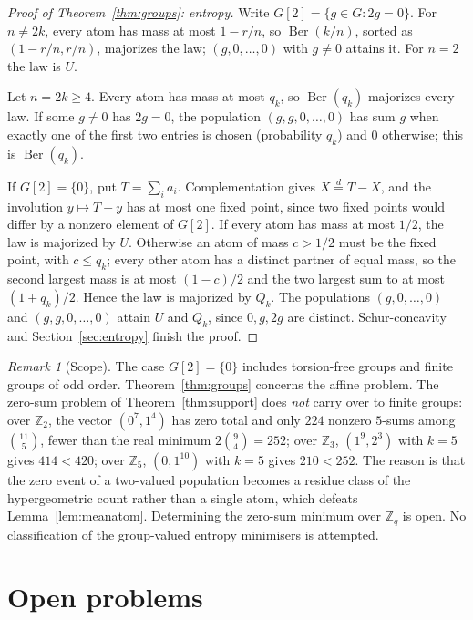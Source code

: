 \documentclass[11pt]{article}
\theoremstyle{remark}
\newtheorem{remark}[theorem]{Remark}
\newcommand{\Z}{\mathbb Z}
\newcommand{\Ber}{\operatorname{Ber}}
\begin{document}
\begin{proof}[Proof of Theorem~\ref{thm:groups}: entropy]
Write \(G[2]=\{g\in G:2g=0\}\). For \(n\ne2k\), every atom has mass at most
\(1-r/n\), so \(\Ber(k/n)\), sorted as \((1-r/n,r/n)\), majorizes the law;
\((g,0,\ldots,0)\) with \(g\ne0\) attains it. For \(n=2\) the law is \(U\).

Let \(n=2k\ge4\). Every atom has mass at most \(q_k\), so \(\Ber(q_k)\)
majorizes every law. If some \(g\ne0\) has \(2g=0\), the population
\((g,g,0,\ldots,0)\) has sum \(g\) when exactly one of the first two entries
is chosen (probability \(q_k\)) and \(0\) otherwise; this is \(\Ber(q_k)\).

If \(G[2]=\{0\}\), put \(T=\sum_ia_i\). Complementation gives
\(X\overset d=T-X\), and the involution \(y\mapsto T-y\) has at most one fixed
point, since two fixed points would differ by a nonzero element of \(G[2]\).
If every atom has mass at most \(1/2\), the law is majorized by \(U\).
Otherwise an atom of mass \(c>1/2\) must be the fixed point, with \(c\le q_k\);
every other atom has a distinct partner of equal mass, so the second largest
mass is at most \((1-c)/2\) and the two largest sum to at most
\((1+q_k)/2\). Hence the law is majorized by \(Q_k\). The populations
\((g,0,\ldots,0)\) and \((g,g,0,\ldots,0)\) attain \(U\) and \(Q_k\), since
\(0,g,2g\) are distinct. Schur-concavity and Section~\ref{sec:entropy} finish
the proof.
\end{proof}

\begin{remark}[Scope]\label{rem:Zq}
The case \(G[2]=\{0\}\) includes torsion-free groups and finite groups of odd
order. Theorem~\ref{thm:groups} concerns the affine problem. The zero-sum
problem of Theorem~\ref{thm:support} does \emph{not} carry over to finite
groups: over \(\Z_2\), the vector \((0^7,1^4)\) has zero total and only \(224\)
nonzero \(5\)-sums among \(\binom{11}5\), fewer than the real minimum
\(2\binom94=252\); over \(\Z_3\), \((1^9,2^3)\) with \(k=5\) gives \(414<420\);
over \(\Z_5\), \((0,1^{10})\) with \(k=5\) gives \(210<252\). The reason is
that the zero event of a two-valued population becomes a residue class of the
hypergeometric count rather than a single atom, which defeats
Lemma~\ref{lem:meanatom}. Determining the zero-sum minimum over \(\Z_q\) is
open. No classification of the group-valued entropy minimisers is attempted.
\end{remark}

\section{Open problems}\label{sec:open}
\end{document}
